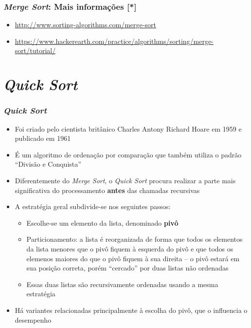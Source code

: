 \documentclass[aspectratio=169]{beamer}
\begin{document}
\begin{frame}[fragile]\frametitle{\emph{Merge Sort}: Mais informações [*]}
\begin{itemize}
	\item \url{http://www.sorting-algorithms.com/merge-sort}
	\item \url{https://www.hackerearth.com/practice/algorithms/sorting/merge-sort/tutorial/}
\end{itemize}
\end{frame}

\section{\emph{Quick Sort}}

\begin{frame}\frametitle{\emph{Quick Sort}}
\begin{itemize}
	\item Foi criado pelo cientista britânico Charles Antony Richard Hoare em 1959 e publicado em 1961
	\item É um algoritmo de ordenação por comparação que também utiliza o padrão ``Divisão e Conquista''
	\item Diferentemente do \emph{Merge Sort}, o \emph{Quick Sort} procura realizar a parte mais significativa do processamento \textbf{antes} das chamadas recursivas
	\item A estratégia geral subdivide-se nos seguintes passos:
	\begin{itemize}
		\item Escolhe-se um elemento da lista, denominado \textbf{pivô}
		\item Particionamento: a lista é reorganizada de forma que todos os elementos da lista menores que o pivô fiquem  à esquerda do pivô e que todos os elemenos maiores do que o pivô fiquem à sua direita -- o pivô estará em sua posição correta, porém  ``cercado'' por duas listas não ordenadas
		\item Essas duas listas são recursivamente ordenadas usando a mesma estratégia
	\end{itemize}
	\item Há variantes relacionadas principalmente à escolha do pivô, que o influencia o desempenho
\end{itemize}
\end{frame}
\end{document}
